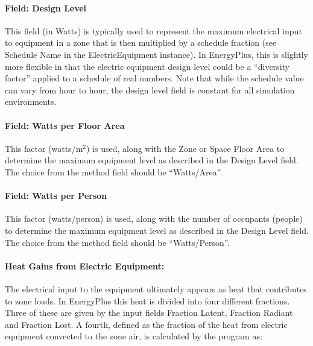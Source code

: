 \paragraph{Field: Design Level}\label{field-design-level-000-ee-definition}

This field (in Watts) is typically used to represent the maximum electrical input to equipment in a zone that is then multiplied by a schedule fraction (see Schedule Name in the ElectricEquipment instance). In EnergyPlus, this is slightly more flexible in that the electric equipment design level could be a ``diversity factor'' applied to a schedule of real numbers. Note that while the schedule value can vary from hour to hour, the design level field is constant for all simulation environments.

\paragraph{Field: Watts per Floor Area}\label{field-watts-per-zone-floor-area-1-ee-definition}

This factor (watts/m\(^{2}\)) is used, along with the Zone or Space Floor Area to determine the maximum equipment level as described in the Design Level field. The choice from the method field should be ``Watts/Area''.

\paragraph{Field: Watts per Person}\label{field-watts-per-person-1-ee-definition}

This factor (watts/person) is used, along with the number of occupants (people) to determine the maximum equipment level as described in the Design Level field. The choice from the method field should be ``Watts/Person''.

\paragraph{Heat Gains from Electric Equipment:}\label{heat-gains-from-electric-equipment-ee-definition}

The electrical input to the equipment ultimately appears as heat that contributes to zone loads. In EnergyPlus this heat is divided into four different fractions. Three of these are given by the input fields Fraction Latent, Fraction Radiant and Fraction Lost. A fourth, defined as the fraction of the heat from electric equipment convected to the zone air, is calculated by the program as:


